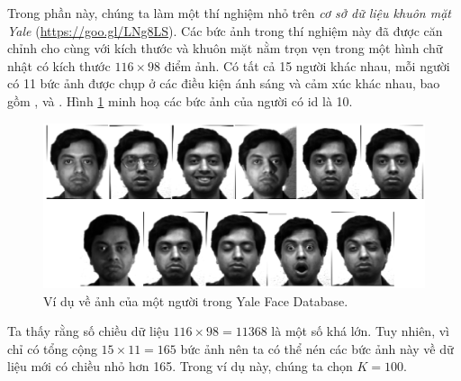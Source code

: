 Trong phần này, chúng ta làm một thí nghiệm nhỏ trên \textit{cơ sở dữ liệu
khuôn mặt Yale} (\url{https://goo.gl/LNg8LS}). Các bức ảnh trong thí nghiệm
này đã được căn chỉnh cho cùng với kích thước và khuôn mặt nằm trọn vẹn trong
một hình chữ nhật có kích thước $116 \times  98$ điểm ảnh. Có tất cả 15 người khác
nhau, mỗi người có 11 bức ảnh được chụp ở các điều kiện ánh sáng và cảm xúc khác
nhau, bao gồm , và
. Hình \ref{fig:28_1} minh hoạ các bức ảnh của
người có id là 10. 
 

\begin{figure}[t]
\centering
    \includegraphics[width = \textwidth]{Chapters/07_DimemsionalityReduction/28_pca2/latex/yaleb_exs.pdf}
    \caption[]{Ví dụ về ảnh của một người trong Yale Face Database.}
    \label{fig:28_1}
\end{figure}
Ta thấy rằng số chiều dữ liệu $116 \times 98 = 11368$ là một số khá
lớn. Tuy nhiên, vì chỉ có tổng cộng $15 \times 11 = 165$ bức ảnh nên ta có thể
nén các bức ảnh này về dữ liệu mới có chiều nhỏ hơn 165. Trong ví dụ này, chúng
ta chọn $K = 100$.
 
